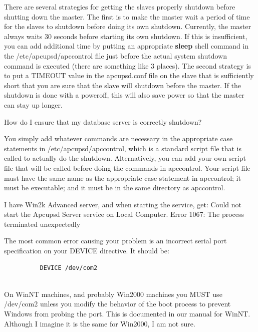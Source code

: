{{{{{{{{\begin{description}
{{{\item [A:]
   There are several strategies for getting the slaves properly shutdown before
shutting down the master. The first is to make the master wait a period of
time for the slaves to shutdown before doing its own shutdown. Currently, the
master always waits 30 seconds before starting its own shutdown. If this is
insufficient, you can add additional time by putting an appropriate {\bf
sleep} shell command in the /etc/apcupsd/apccontrol file just before the
actual system shutdown command is executed (there are something like 3
places). The second strategy is to put a TIMEOUT value in the apcupsd.conf
file on the slave that is sufficiently short that you are sure that the slave
will shutdown before the master. If the shutdown is done with a poweroff, this
will also save power so that the master can stay up longer.  

\item [Q:]
   How do I ensure that my database server is correctly shutdown?  

\item [A:]
   You simply add whatever commands are necessary in the appropriate case
statements in /etc/apcupsd/apccontrol, which is a standard script file that is
called to actually do the shutdown. Alternatively, you can add your own script
file that will be called before doing the commands in apccontrol. Your script
file must have the same name as the appropriate case statement in apccontrol;
it must be executable; and it must be in the same directory as apccontrol.  

\item [Q:]
   I have Win2k Advanced server, and when starting the service, get: Could not
start the Apcupsd Server service on Local Computer. Error 1067: The process
terminated unexpectedly  

\item [A:]
   The most common error causing your problem is an incorrect serial port
specification on your DEVICE directive. It should be:  

\footnotesize
\begin{verbatim}
          DEVICE /dev/com2
     
\end{verbatim}
\normalsize

On WinNT machines, and probably Win2000 machines you MUST use /dev/com2 unless
you modify the behavior of the boot process to prevent Windows from probing
the port. This is documented in our manual for WinNT. Although I imagine it is
the same for Win2000, I am not sure.  

}}}
\end{description}}}}}}}}}
